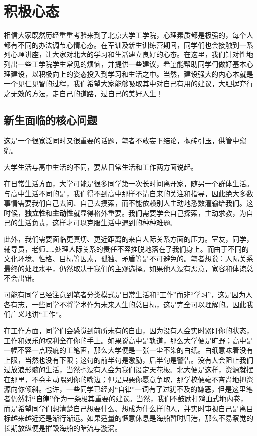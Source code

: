 \chapter{积极心态}
相信大家既然历经重重考验来到了北京大学工学院，心理素质都是极强的，每个人都有不同的办法调节心情心态。在军训及新生训练营期间，同学们也会接触到一系列心理讲座，让大家对北大的学习和生活建立良好的心态。在这里，我们针对性地列出一些工学院学生常见的烦恼，并提供一些建议，希望能帮助同学们做好基本心理建设，以积极向上的姿态投入到学习和生活之中。当然，建设强大的内心本就是一个见仁见智的过程，我们希望大家能够吸取其中对自己有用的建议，大胆摒弃行之无效的方法，走自己的道路，过自己的美好人生！

\section{新生面临的核心问题}
这是一个很宽泛同时又很重要的话题，笔者不敢妄下结论，抛砖引玉，供管中窥豹。

\vspace{10pt}

大学生活与高中生活的不同，要从日常生活和工作两方面说起。

\vspace{10pt}

在日常生活方面，大学可能是很多同学第一次长时间离开家，随另一个群体生活。与高中生活不同的是，我们得不到高中那样不请自来的关注和指导，因此绝大多数事情需要我们自己去问、自己去摸索，而不能依赖别人主动地悉数灌输给我们。这时候，\textbf{独立性}和\textbf{主动性}就显得格外重要。我们需要学会自己探索，主动求教，为自己的生活负责，这样才可以克服生活中遇到的种种难题。

\vspace{10pt}

此外，我们需要面临更真切、更近距离的来自人际关系方面的压力。室友，同学，辅导员，老师……处理人际关系的责任不容推脱地落在了我们身上。而由于不同的文化环境、性格、目标等因素，孤独、矛盾等是不可避免的。笔者想说：人际关系最终的处理水平，仍然取决于我们的主观选择。如果他人没有恶意，宽容和体谅总不会出错。

\vspace{10pt}

可能有同学已经注意到笔者分类模式是日常生活和“工作”而非“学习”，这是因为人各有志，一些同学不将学术作为未来人生的总目标，这是完全可以理解的。因此我们广义地讲“工作”。

\vspace{10pt}

在工作方面，同学们会感觉到前所未有的自由，因为没有人会实时紧盯你的状态，工作和娱乐的权利全在你的手上。如果说高中是轨道，那么大学便是旷野；高中是一幅不容一点瑕疵的工笔画，那么大学便是一张一尘不染的白纸。白纸意味着没有上限，当然也没有下限；这句的前半句是激励，后半句是警告。没有人会阻止我们过放浪形骸的生活，当然也没有人会为我们设定天花板。北大便是这样，资源就摆在那里，不会主动喂到你的嘴边；但是只要你愿意争取，那学校便毫不吝啬地把资源向你倾斜。也许，一些同学已经对“自律”一词有了过犹不及的嫌恶，但是这里笔者仍然将\textbf{“自律”}作为一条极其重要的建议。当然，我们不鼓励打鸡血式地内卷，而是希望同学们想清楚自己想要什么、想成为什么样的人，并实时审视自己是离目标越来越近还是渐行渐远。如果适量的惬意休息是海船暂时归港，那么不易察觉的长期放纵便是摧毁海船的暗流与漩涡。

